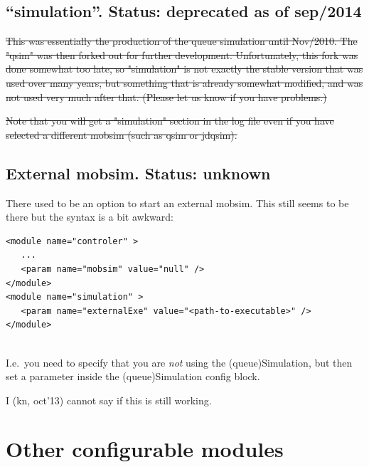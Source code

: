 \umbruch
\section{``simulation''. Status: deprecated as of sep/2014}

\sout{This  was essentially the production of the queue simulation until Nov/2010.  The "qsim" was then forked out for further development. Unfortunately,  this fork was done somewhat too late, so "simulation" is not exactly the  stable version that was used over many years, but something that is  already somewhat modified, and was not used very much after that.  (Please let us know if you have problems.)}

\sout{Note that you will get a "simulation" section in the log file even if  you have selected a different mobsim (such as qsim or jdqsim).}

\umbruch
\section{External mobsim.  Status: unknown}



There used to be an option to start an external mobsim. This still seems to be there but the syntax is a bit awkward:
\begin{lstlisting}
<module name="controler" >
   ...
   <param name="mobsim" value="null" />
</module>
<module name="simulation" >
   <param name="externalExe" value="<path-to-executable>" />
</module>


\end{lstlisting}

I.e.\ you need to specify that you are \emph{not} using the (queue)Simulation, but then set a parameter inside the (queue)Simulation config block.

I (kn, oct'13) cannot say if this is still working.  

\umbruch

\chapter{Other configurable modules}

